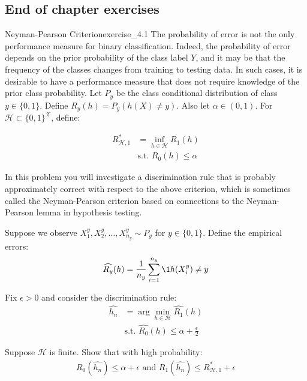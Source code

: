 \subsection{End of chapter exercises}
\begin{exercise}{Neyman-Pearson Criterion}{exercise_4.1}
    The probability of error is not the only performance measure for binary classification. Indeed, the
    probability of error depends on the prior probability of the class label $Y$, and it may be that the
    frequency of the classes changes from training to testing data. In such cases, it is desirable to have a performance measure that does not require knowledge of the prior class probability. Let $P_y$ be the class conditional distribution of class $y\in\{0,1\}$. Define $R_y(h)=P_y(h(X) \ne y)$. Also let $\alpha \in (0,1)$. For $\mathcal{H}\subset\{0,1\}^{\mathcal{X}}$, define:

    \begin{align*}
        R^*_{\mathcal{H}, 1} &= \inf_{h\in\mathcal{H}} R_1(h) \\
        &\text{s.t. } R_0(h) \le \alpha 
    \end{align*}

    In this problem you will investigate a discrimination rule that is probably approximately correct with respect to the above criterion, which is sometimes called the Neyman-Pearson criterion based on connections to the Neyman-Pearson lemma in hypothesis testing.

    \noindent Suppose we observe $X_1^y, X_2^y, \dots, X_{n_y}^y \sim P_y$ for $y\in\{0,1\}$. Define the empirical errors:
    \begin{align*}
        \widehat{R_y}(h) = \frac{1}{n_y} \sum_{i=1}^{n_y} \1{h(X_i^y) \ne y}
    \end{align*}

    Fix $\epsilon > 0$ and consider the discrimination rule:
    \begin{align*}
        \widehat{h_n} &= \arg\min_{h\in\mathcal{H}} \widehat{R_1}(h) \\
        &\text{s.t. } \widehat{R_0}(h) \le \alpha + \frac{\epsilon}{2} 
    \end{align*}

    Suppose $\mathcal{H}$ is finite. Show that with high probability:
    \begin{align*}
        R_0(\widehat{h_n}) \le \alpha + \epsilon \text{ and } R_1(\widehat{h_n}) \le R^*_{\mathcal{H}, 1} + \epsilon
    \end{align*}
\end{exercise}

\begin{solution*}
    
\end{solution*}